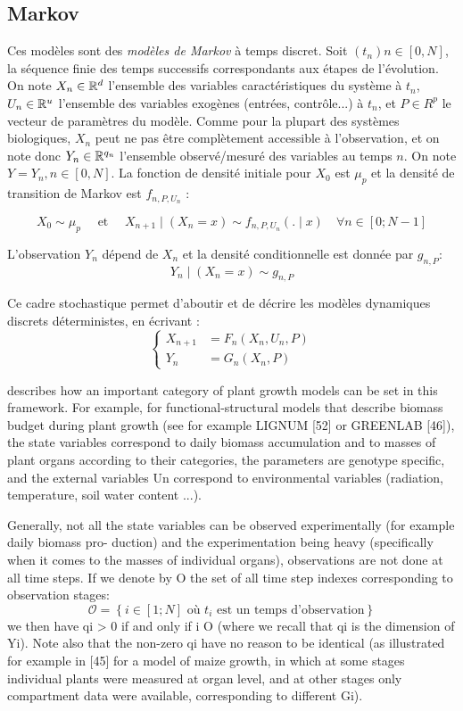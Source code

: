 \subsection{Markov}

Ces modèles sont des \emph{modèles de Markov} à temps discret. 
Soit $(t_{n}) n \in [0,N]$, la séquence finie des temps successifs correspondants
aux étapes de l’évolution. On note $X_{n}\in \mathbb{R}^d$
l'ensemble des variables caractéristiques du système à $t_{n}$, $U_n \in \mathbb{R}^u$
l'ensemble des variables exogènes (entrées, contrôle...) à $t_{n}$,
et $P\in R^p$ le vecteur de paramètres du modèle.
Comme pour la plupart des systèmes biologiques, $X_{n}$ peut ne pas être
complètement accessible à l'observation, et on note donc $Y_n \in \mathbb{R}^{q_n}$
l'ensemble observé/mesuré des variables au temps $n$.
On note $Y=Y_n, n \in [0,N]$.
La fonction de densité initiale pour $X_0$ est $\mu_p$ 
et la densité de transition de Markov est $f_{n,P,U_n}$ :

\[
	X_0 \sim \mu_p \quad \text{ et } \quad
	 X_{n+1} \mid (X_n=x) \sim f_{n,P,U_n}(.\mid x)	\quad \forall n \in [0;N-1]
\]

L'observation $Y_n$ dépend de $X_n$ et la densité conditionnelle 
est donnée par $g_{n,P}$:
\[Y_n \mid (X_n = x) \sim g_{n,P} \]

Ce cadre stochastique permet d'aboutir et de décrire les modèles dynamiques discrets déterministes, en écrivant : 
\[
\left\{
    \begin{array}{ll}
        X_{n+1} &= F_n(X_n,U_n,P) \\
        Y_n &= G_n(X_n,P)
    \end{array}
\right.
\]

describes how an important category of plant growth models can be set in this framework. For example, for functional-structural models that describe biomass budget during plant growth (see for example LIGNUM [52] or GREENLAB [46]), the state variables correspond to daily biomass accumulation and to masses of plant organs according to their categories, the parameters are genotype specific, and the external variables Un correspond to environmental variables (radiation, temperature, soil water content ...).

Generally, not all the state variables can be observed experimentally (for example daily biomass pro- duction) and the experimentation being heavy (specifically when it comes to the masses of individual organs), observations are not done at all time steps. If we denote by O the set of all time step indexes corresponding to observation stages:
\[
  \mathcal{O} = \left\{i \in [1; N ] \text{ où } 
  t_i \text{ est un temps d'observation}\right\} 
\]
we then have qi > 0 if and only if i  O (where we recall that qi is the dimension of Yi). Note also that the non-zero qi have no reason to be identical (as illustrated for example in [45] for a model of maize growth, in which at some stages individual plants were measured at organ level, and at other stages only compartment data were available, corresponding to different Gi).

